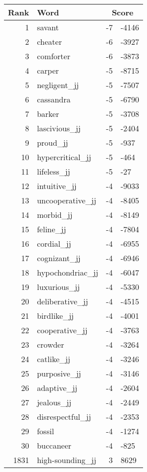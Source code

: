 \begin{longtable}[!htbp]{| rlr@{.}l |}
    \hline
    \textbf{Rank} & \textbf{Word} & \multicolumn{2}{c|}{\textbf{Score}} \\
    \hline
    \endhead
    1 & savant & -7 & -4146 \\
    2 & cheater & -6 & -3927 \\
    3 & comforter & -6 & -3873 \\
    4 & carper & -5 & -8715 \\
    5 & negligent\_jj & -5 & -7507 \\
    6 & cassandra & -5 & -6790 \\
    7 & barker & -5 & -3708 \\
    8 & lascivious\_jj & -5 & -2404 \\
    9 & proud\_jj & -5 & -937 \\
    10 & hypercritical\_jj & -5 & -464 \\
    11 & lifeless\_jj & -5 & -27 \\
    12 & intuitive\_jj & -4 & -9033 \\
    13 & uncooperative\_jj & -4 & -8405 \\
    14 & morbid\_jj & -4 & -8149 \\
    15 & feline\_jj & -4 & -7804 \\
    16 & cordial\_jj & -4 & -6955 \\
    17 & cognizant\_jj & -4 & -6946 \\
    18 & hypochondriac\_jj & -4 & -6047 \\
    19 & luxurious\_jj & -4 & -5330 \\
    20 & deliberative\_jj & -4 & -4515 \\
    21 & birdlike\_jj & -4 & -4001 \\
    22 & cooperative\_jj & -4 & -3763 \\
    23 & crowder & -4 & -3264 \\
    24 & catlike\_jj & -4 & -3246 \\
    25 & purposive\_jj & -4 & -3146 \\
    26 & adaptive\_jj & -4 & -2604 \\
    27 & jealous\_jj & -4 & -2449 \\
    28 & disrespectful\_jj & -4 & -2353 \\
    29 & fossil & -4 & -1274 \\
    30 & buccaneer & -4 & -825 \\
    1831 & high-sounding\_jj & 3 & 8629 \\

\end{longtable}

